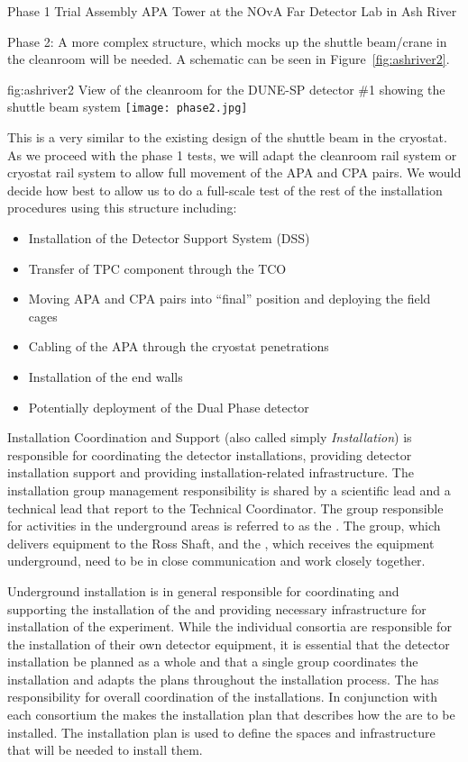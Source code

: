 Phase 1 Trial Assembly APA Tower at the NOvA Far Detector Lab in Ash River

Phase 2: A more complex structure, which mocks up the shuttle
beam/crane in the cleanroom will be needed. A schematic can be seen in
Figure~\ref{fig:ashriver2}.
\begin{dunefigure}{fig:ashriver2}
  {View of the cleanroom for the DUNE-SP detector \#1 showing the shuttle beam system}
  \texttt{[image: phase2.jpg]}
\end{dunefigure}
This is a very similar to the existing
design of the shuttle beam in the cryostat.  As we proceed with the
phase 1 tests, we will adapt the cleanroom rail system or cryostat
rail system to allow full movement of the APA and CPA pairs. We would
decide how best to allow us to do a full-scale test of the rest of the
installation procedures using this structure including:
\begin{itemize}
 \item Installation of the Detector Support System (DSS)
 \item Transfer of TPC component through the TCO
 \item Moving APA and CPA pairs into “final” position and deploying the field cages
 \item Cabling of the APA through the cryostat penetrations
 \item Installation of the end walls
 \item Potentially deployment of the Dual Phase detector
\end{itemize}


Installation Coordination and Support (also called simply
\textit{Installation}) is responsible for coordinating the detector
installations, providing detector installation support and providing
installation-related infrastructure. The installation group management
responsibility is shared by a scientific lead and a technical lead
that report to the Technical Coordinator. The group responsible for
activities in the underground areas is referred to as the
. The  group, which delivers equipment to the
Ross Shaft, and the , which receives the equipment
underground, need to be in close communication and work closely
together.

Underground installation is in general responsible for coordinating
and supporting the installation of the  and
providing necessary infrastructure for installation of the
experiment. While the individual consortia are responsible for the
installation of their own detector equipment, it is essential that the
detector installation be planned as a whole and that a single group
coordinates the installation and adapts the plans throughout the
installation process. The  has responsibility for overall
coordination of the installations. In conjunction with each consortium
the  makes the installation plan that describes how the
 are to be installed. The installation plan is used
to define the spaces and infrastructure that will be needed to install
them.

